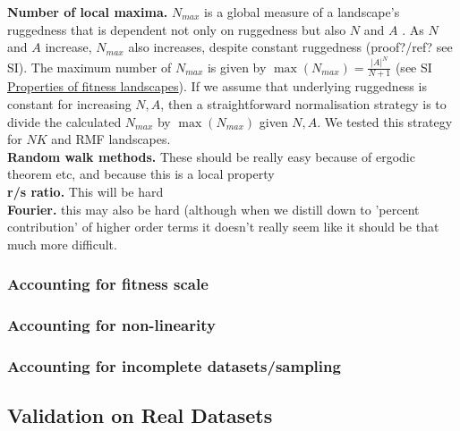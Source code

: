 \documentclass[10pt, reqno]{amsart}
\begin{document}
\textbf{Number of local maxima.} $N_{max}$ is a global measure of a landscape's ruggedness that is dependent not only on ruggedness but also $N$ and $A$ \supercite{Szendro2013, Kauffman1993}. As $N$ and $A$ increase, $N_{max}$ also increases, despite constant ruggedness (proof?/ref? see SI). The maximum number of $N_{max}$ is given by $\max (N_{max}) = \frac{|A|^N}{N+1}$ (see SI \hyperref[SI properties]{Properties of fitness landscapes}). If we assume that underlying ruggedness is constant for increasing $N, A$, then a straightforward normalisation strategy is to divide the calculated $N_{max}$ by $\max (N_{max})$ given $N,A$. We tested this strategy for $NK$ and RMF \supercite{Neidhart2014} landscapes. \\














\textbf{Random walk methods.} These should be really easy because of ergodic theorem etc, and because this is a local property \\

 \textbf{r/s ratio.} This will be hard\\

 \textbf{Fourier.} this may also be hard (although when we distill down to 'percent contribution' of higher order terms it doesn't really seem like it should be that much more difficult. \supercite{Neidhart2013}





\subsubsection{Accounting for fitness scale}
\subsubsection{Accounting for non-linearity}
\subsubsection{Accounting for incomplete datasets/sampling}


\subsection{Validation on Real Datasets}
\end{document}
